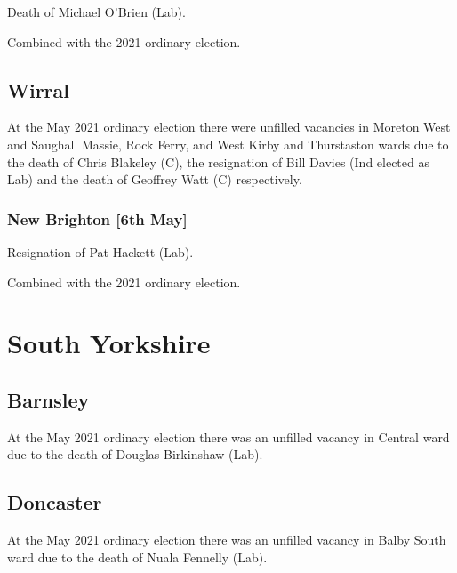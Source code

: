 \documentclass[a4paper,openany]{book}
\begin{document}
\begin{resultsiii}

Death of Michael O'Brien (Lab).

Combined with the 2021 ordinary election.

\subsection*{Wirral}

At the May 2021 ordinary election there were unfilled vacancies in Moreton West and Saughall Massie, Rock Ferry, and West Kirby and Thurstaston wards due to the death of Chris Blakeley (C), the resignation of Bill Davies (Ind elected as Lab) and the death of Geoffrey Watt (C) respectively.

\subsubsection*{New Brighton \hspace*{\fill}\nolinebreak[1]%
	\enspace\hspace*{\fill}
	[6th May]}


Resignation of Pat Hackett (Lab).

Combined with the 2021 ordinary election.

\section{South Yorkshire}

\subsection*{Barnsley}

At the May 2021 ordinary election there was an unfilled vacancy in Central ward due to the death of Douglas Birkinshaw (Lab).

\subsection*{Doncaster}

At the May 2021 ordinary election there was an unfilled vacancy in Balby South ward due to the death of Nuala Fennelly (Lab).


\end{resultsiii}
\end{document}
